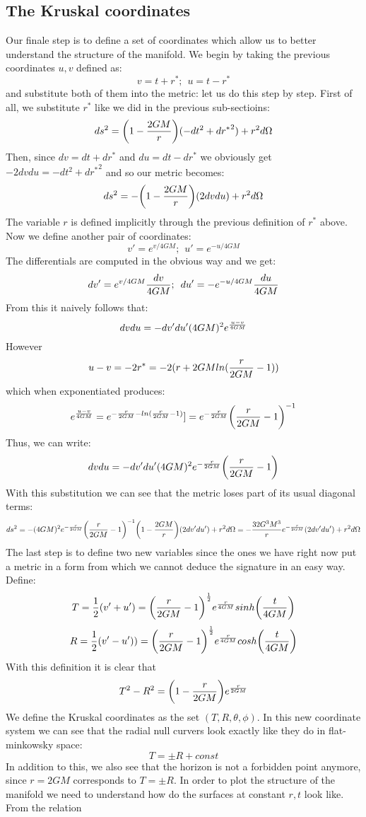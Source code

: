 \documentclass[]{article}
\theoremstyle{definition}
\theoremstyle{Theorem}
\theoremstyle{definition}
\theoremstyle{definition}
\theoremstyle{definition}
\begin{document}
\subsection{The Kruskal coordinates }
Our finale step is to define a set of coordinates which allow us to better understand the structure of the manifold. We begin by taking the previous coordinates $u,v$ defined as:
$$v=t+r^*;\hspace{5pt} u=t-r^*$$ and substitute both of them into the metric: let us do this step by step. First of all, we substitute $r^*$ like we did in the previous sub-sectioins:
$$ds^2=\bigg(1-{2GM\over r}\bigg)(-dt^2+{dr^*}^2)+r^2d\Omega$$
Then, since $dv=dt+dr^*$ and $du=dt-dr^*$ we obviously get $-2dvdu=-dt^2+d{r^*}^2$ and so our metric becomes:
$$ds^2=-\bigg(1-{2GM\over r}\bigg)(2dvdu)+r^2d\Omega$$
The variable $r$ is defined implicitly through the previous definition of $r^*$ above. Now we define another pair of coordinates:
$$v'=e^{v/4GM};\hspace{5pt} u'=e^{-u/4GM}$$
The differentials are computed in the obvious way and we get: $$dv'=e^{v/4GM}{dv\over 4GM};\hspace{5pt} du'=-e^{-u/4GM}{du\over 4GM}$$
From this it naively follows that:
$$dvdu=-dv'du'(4GM)^2e^{u-v\over 4GM}$$
However $$u-v=-2r^*=-2(r+2GMln({r\over 2GM}-1))$$
which when exponentiated produces:
$$e^{u-v\over 4GM}=e^{-{r\over 2GM}-ln({r\over 2GM}-1)}]=e^{-{r\over 2GM}}\bigg({r\over 2GM}-1\bigg)^{-1}$$
Thus, we can write:
$$dvdu=-dv'du'(4GM)^2e^{-{r\over 2GM}}\bigg({r\over 2GM}-1\bigg)$$
With this substitution we can see that the metric loses part of its usual diagonal terms:
$$ds^2=-(4GM)^2e^{-{r\over 2GM}}\bigg({r\over 2GM}-1\bigg)^{-1}\bigg(1-{2GM\over r}\bigg)(2dv'du')+r^2d\Omega=-{32G^3M^3\over r}e^{-{r\over 2GM}}(2dv'du')+r^2d\Omega$$
The last step is to define two new variables since the ones we have right now put a metric in a form from which we cannot deduce the signature in an easy way.
Define:
$$T={1\over 2}(v'+u')=\bigg({r\over 2GM}-1\bigg)^{1\over 2}e^{r\over 4GM}sinh\bigg({t\over 4GM}\bigg)$$ 
$$R={1\over 2}(v'-u'))=\bigg({r\over 2GM}-1\bigg)^{1\over 2}e^{r\over 4GM}cosh\bigg({t\over 4GM}\bigg)$$
With this definition it is clear that
$$T^2-R^2=\bigg(1-{r\over 2GM}\bigg)e^{r\over 2GM}$$
We define the Kruskal coordinates as the set $(T,R,\theta, \phi)$. In this new coordinate system we can see that the radial null curvers look exactly like they do in flat-minkowsky space:
$$T=\pm R+const$$
In addition to this, we also see that the horizon is not a forbidden point anymore, since $r=2GM$ corresponds to $T=\pm R$. In order to plot the structure of the manifold we need to understand how do the surfaces at constant $r,t$ look like. From the relation
\end{document}
